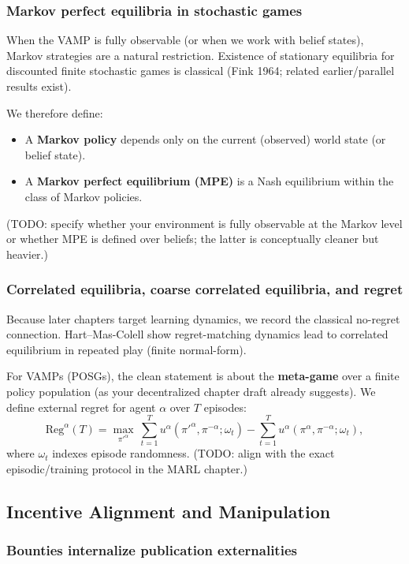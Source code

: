 \subsubsection{Markov perfect equilibria in stochastic games}

When the VAMP is fully observable (or when we work with belief states), Markov strategies are a natural restriction. Existence of stationary equilibria for discounted finite stochastic games is classical (Fink 1964; related earlier/parallel results exist).

We therefore define:
\begin{itemize}
\item A \textbf{Markov policy} depends only on the current (observed) world state (or belief state).
\item A \textbf{Markov perfect equilibrium (MPE)} is a Nash equilibrium within the class of Markov policies.
\end{itemize}

(TODO: specify whether your environment is fully observable at the Markov level or whether MPE is defined over beliefs; the latter is conceptually cleaner but heavier.)

\subsubsection{Correlated equilibria, coarse correlated equilibria, and regret}

Because later chapters target learning dynamics, we record the classical no-regret connection. Hart--Mas-Colell show regret-matching dynamics lead to correlated equilibrium in repeated play (finite normal-form).

For VAMPs (POSGs), the clean statement is about the \textbf{meta-game} over a finite policy population (as your decentralized chapter draft already suggests). We define external regret for agent \(\alpha\) over \(T\) episodes:
\[
\mathrm{Reg}^\alpha(T)=
\max_{\pi'^\alpha}\ \sum_{t=1}^T u^\alpha(\pi'^\alpha,\pi^{-\alpha};\omega_t)
-\sum_{t=1}^T u^\alpha(\pi^\alpha,\pi^{-\alpha};\omega_t),
\]
where \(\omega_t\) indexes episode randomness. (TODO: align with the exact episodic/training protocol in the MARL chapter.)

\subsection{Incentive Alignment and Manipulation}

\subsubsection{Bounties internalize publication externalities}

